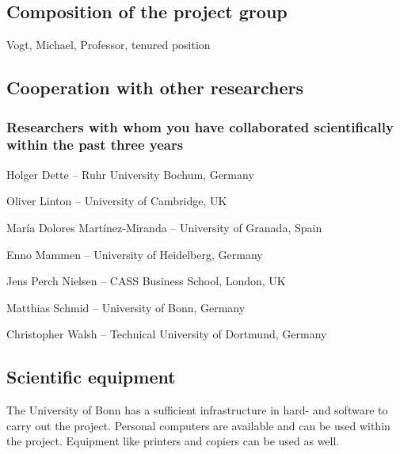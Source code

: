 \documentclass[a4paper,12pt]{article}
\begin{document}
\subsection{Composition of the project group}
Vogt, Michael, Professor, tenured position

\subsection{Cooperation with other researchers}


\subsubsection{Researchers with whom you have collaborated scientifically within the past three years}

\noindent Holger Dette -- Ruhr University Bochum, Germany 

\noindent Oliver Linton -- University of Cambridge, UK

\noindent Mar\'ia Dolores Mart\'inez-Miranda -- University of Granada, Spain

\noindent Enno Mammen -- University of Heidelberg, Germany

\noindent Jens Perch Nielsen -- CASS Business School, London, UK 

\noindent Matthias Schmid -- University of Bonn, Germany

\noindent Christopher Walsh -- Technical University of Dortmund, Germany 


\subsection{Scientific equipment}
The University of Bonn has a sufficient infrastructure in hard- and software to carry out the project. Personal computers are available and can be used within the project. Equipment like printers and copiers can be used as well.

\end{document}
